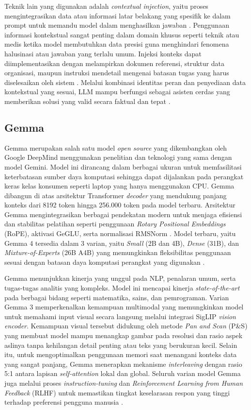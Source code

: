 Teknik lain yang digunakan adalah \textit{contextual injection}, yaitu proses mengintegrasikan data atau informasi latar belakang yang spesifik ke dalam prompt untuk memandu model dalam menghasilkan jawaban \parencite{Velsquez-Henao2023, Zhao2025}. Penggunaan informasi kontekstual sangat penting dalam domain khusus seperti teknik atau medis ketika model membutuhkan data presisi guna menghindari fenomena halusinasi atau jawaban yang terlalu umum. Injeksi konteks dapat diimplementasikan dengan melampirkan dokumen referensi, struktur data organisasi, maupun instruksi mendetail mengenai batasan tugas yang harus diselesaikan oleh sistem \parencite{Velsquez-Henao2023}. Melalui kombinasi identitas peran dan penyediaan data kontekstual yang sesuai, LLM mampu berfungsi sebagai asisten cerdas yang memberikan solusi yang valid secara faktual dan tepat \parencite{Tseng2024}.

\subsection{Gemma}

Gemma merupakan salah satu model \textit{open source} yang dikembangkan oleh Google DeepMind menggunakan penelitian dan teknologi yang sama dengan model Gemini. Model ini dirancang dalam berbagai ukuran untuk memfasilitasi keterbatasan sumber daya komputasi sehingga dapat dijalankan pada perangkat keras kelas konsumen seperti laptop yang hanya menggunakan CPU. Gemma dibangun di atas arsitektur Transformer \textit{decoder} yang mendukung panjang konteks dari 8192 token hingga 256.000 token pada model terbaru. Arsitektur Gemma mengintegrasikan berbagai pendekatan modern untuk menjaga efisiensi dan stabilitas pelatihan seperti penggunaan \textit{Rotary Positional Embeddings} (RoPE), aktivasi GeGLU, serta normalisasi RMSNorm \parencite{GemmaTeam2024}. Model terbaru, yaitu Gemma 4 tersedia dalam 3 varian, yaitu \textit{Small} (2B dan 4B), \textit{Dense} (31B), dan \textit{Mixture-of-Experts} (26B A4B) yang memungkinkan fleksibilitas penggunaan sesuai dengan batasan daya komputasi perangkat yang digunakan \parencite{Gemma4Model}.

Gemma menunjukkan kinerja yang unggul pada NLP, penalaran umum, serta tugas-tugas analitis yang kompleks. Model ini mencapai kinerja \textit{state-of-the-art} pada berbagai bidang seperti matematika, sains, dan pemrograman. Varian Gemma 3 memperkenalkan kemampuan multimodal yang memungkinkan model untuk memahami input visual secara langsung melalui integrasi SigLIP \textit{vision encoder}. Kemampuan visual tersebut didukung oleh metode \textit{Pan and Scan} (P\&S) yang membuat model mampu menangkap gambar pada resolusi dan rasio aspek aslinya tanpa kehilangan detail penting atau teks yang berukuran kecil. Selain itu, untuk mengoptimalkan penggunaan memori saat menangani konteks data yang sangat panjang, Gemma menerapkan mekanisme \textit{interleaving} dengan rasio 5:1 antara lapisan \textit{self-attention} lokal dan global. Seluruh varian model Gemma juga melalui proses \textit{instruction-tuning} dan \textit{Reinforcement Learning from Human Feedback} (RLHF) untuk memastikan tingkat keselarasan respon yang tinggi terhadap preferensi pengguna manusia \parencite{GemmaTeam2025}.

